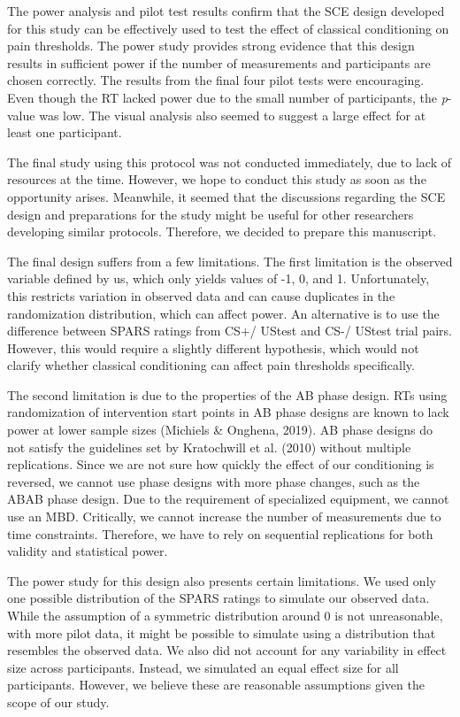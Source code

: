 \documentclass{article}
\begin{document}
The power analysis and pilot test results confirm that the SCE design developed for this study can be effectively used to test the effect of classical conditioning on pain thresholds. The power study provides strong evidence that this design results in sufficient power if the number of measurements and participants are chosen correctly. The results from the final four pilot tests were encouraging. Even though the RT lacked power due to the small number of participants, the \emph{p}-value was low. The visual analysis also seemed to suggest a large effect for at least one participant. 

The final study using this protocol was not conducted immediately, due to lack of resources at the time. However, we hope to conduct this study as soon as the opportunity arises. Meanwhile, it seemed that the discussions regarding the SCE design and preparations for the study might be useful for other researchers developing similar protocols. Therefore, we decided to prepare this manuscript.

The final design suffers from a few limitations. The first limitation is the observed variable defined by us, which only yields values of -1, 0, and 1. Unfortunately, this restricts variation in observed data and can cause duplicates in the randomization distribution, which can affect power. An alternative is to use the difference between SPARS ratings from CS+/ UStest and CS-/ UStest trial pairs. However, this would require a slightly different hypothesis, which would not clarify whether classical conditioning can affect pain thresholds specifically.

The second limitation is due to the properties of the AB phase design. RTs using randomization of intervention start points in AB phase designs are known to lack power at lower sample sizes (Michiels \& Onghena, 2019). AB phase designs do not satisfy the guidelines set by Kratochwill et al. (2010) without multiple replications. Since we are not sure how quickly the effect of our conditioning is reversed, we cannot use phase designs with more phase changes, such as the ABAB phase design. Due to the requirement of specialized equipment, we cannot use an MBD. Critically, we cannot increase the number of measurements due to time constraints. Therefore, we have to rely on sequential replications for both validity and statistical power. 

The power study for this design also presents certain limitations. We used only one possible distribution of the SPARS ratings to simulate our observed data. While the assumption of a symmetric distribution around 0 is not unreasonable, with more pilot data, it might be possible to simulate using a distribution that resembles the observed data. We also did not account for any variability in effect size across participants. Instead, we simulated an equal effect size for all participants. However, we believe these are reasonable assumptions given the scope of our study. 
\end{document}
